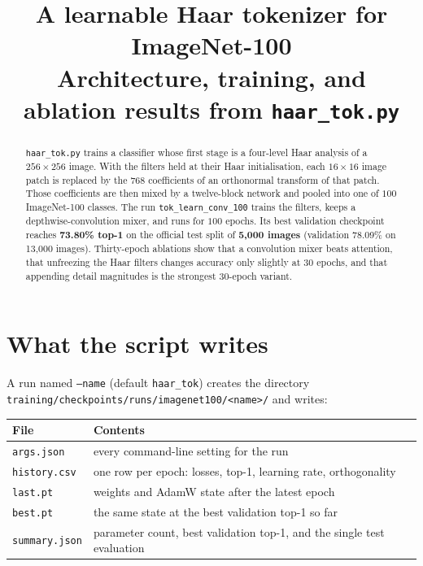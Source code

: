 \documentclass[11pt]{article}
\title{A learnable Haar tokenizer for ImageNet-100\\
\large Architecture, training, and ablation results from \texttt{haar\_tok.py}}
\author{}
\date{}
\begin{document}
\maketitle

\begin{abstract}
\texttt{haar\_tok.py} trains a classifier whose first stage is a four-level
Haar analysis of a $256\times256$ image. With the filters held at their Haar
initialisation, each $16\times16$ image patch is replaced by the $768$
coefficients of an orthonormal transform of that patch. Those coefficients are
then mixed by a twelve-block network and pooled into one of $100$ ImageNet-100
classes. The run \texttt{tok\_learn\_conv\_100} trains the filters, keeps a
depthwise-convolution mixer, and runs for $100$ epochs. Its best validation
checkpoint reaches \textbf{73.80\% top-1} on the official test split of
\textbf{5{,}000 images} (validation 78.09\% on 13{,}000 images). Thirty-epoch
ablations show that a convolution mixer beats attention, that unfreezing the
Haar filters changes accuracy only slightly at $30$ epochs, and that appending
detail magnitudes is the strongest $30$-epoch variant.
\end{abstract}

\section{What the script writes}

A run named \texttt{--name} (default \texttt{haar\_tok}) creates the directory
\texttt{training/checkpoints/runs/imagenet100/<name>/} and writes:

\begin{center}
\begin{tabular}{@{}ll@{}}
\toprule
File & Contents \\
\midrule
\texttt{args.json} & every command-line setting for the run \\
\texttt{history.csv} & one row per epoch: losses, top-1, learning rate, orthogonality \\
\texttt{last.pt} & weights and AdamW state after the latest epoch \\
\texttt{best.pt} & the same state at the best validation top-1 so far \\
\texttt{summary.json} & parameter count, best validation top-1, and the single test evaluation \\
\bottomrule
\end{tabular}
\end{center}
\end{document}
